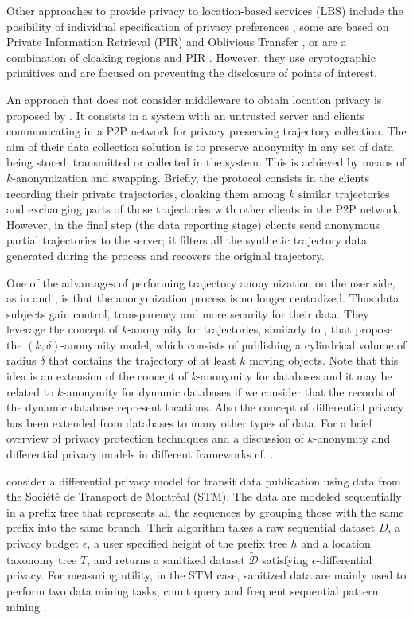 \documentclass[times,twocolumn,final,authoryear]{elsarticle}
\begin{document}
Other approaches to provide privacy to location-based services (LBS) include the posibility of individual specification of privacy preferences \citep{Damiani:2009}, some are based on Private Information Retrieval (PIR) and Oblivious Transfer \citep{Paulet:2014}, or are a combination of cloaking regions and PIR \citep{Ghinita:2011}. However, they use cryptographic primitives and are focused on preventing the disclosure of points of interest.

An approach that does not consider middleware to obtain location privacy is proposed by \citet[Chapter 9]{Gidofalvi2007}. It consists in a system with an untrusted server and clients communicating in a P2P network for privacy preserving trajectory collection.
The aim of their data collection solution is to preserve anonymity in any set of data being stored, transmitted or
collected in the system. This is achieved by means of $k$-anonymization and swapping.
Briefly, the protocol consists in the clients recording their private trajectories, cloaking them among $k$ similar trajectories and exchanging parts of those trajectories with other clients in the P2P network. However, in the final step (the data reporting stage) clients send anonymous partial trajectories to the server; it filters all the synthetic trajectory data generated during the process and recovers the original trajectory.

One of the advantages of performing trajectory anonymization on the user side, as in \cite{Romero-Tris2016} and \cite{Romero-Tris:2018}, is that the anonymization process is no longer centralized. Thus data subjects gain control, transparency and more security for their data.
They leverage the concept of $k$-anonymity for trajectories, similarly to \cite{Abul2008}, that propose the $(k, \delta)$-anonymity model, which consists of publishing a cylindrical volume of radius $\delta$ that contains the trajectory of at least $k$ moving objects. 
Note that this idea is an extension of the concept of $k$-anonymity for databases \citep{Samarati:1998} and it may be related to $k$-anonymity for dynamic databases \citep{Salas:2018-b} if we consider that the records of the dynamic database represent locations.  
Also the concept of differential privacy \citep{Dwork:2006} has been extended from databases to many other types of data.
For a brief overview of privacy protection techniques and a discussion of $k$-anonymity and differential privacy models in different frameworks cf. \cite{Salas:2018}.


\cite{Chen:2012} consider a differential privacy model for transit data publication using data from the Soci\'{e}t\'{e} de Transport de Montr\'{e}al (STM). 
The data are modeled sequentially in a prefix tree that represents all the sequences by grouping those with the same prefix into the same branch.
Their algorithm takes a raw sequential dataset $D$, a privacy budget $\epsilon$, a user specified height of the prefix tree $h$ and a location taxonomy tree $T$, and returns a sanitized dataset $\tilde{\mathcal{D}}$ satisfying $\epsilon$-differential privacy.
For measuring utility, in the STM case, sanitized data are mainly used to perform two
data mining tasks, count query and frequent sequential pattern mining \citep{Agrawal:1995}.
\end{document}
